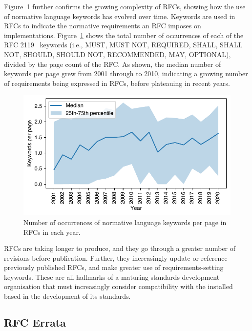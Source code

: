 \documentclass[twocolumn,10pt]{article}
\newlength{\figureWidthOneColumn}
\newcommand{\pb}[1]{\vspace{0.75ex}\noindent{\textbf{#1}}}
\begin{document}
Figure~\ref{fig:keyword_usage_rates} further confirms the growing complexity
of RFCs, showing how the use of normative language keywords has evolved
over time.  Keywords are used in RFCs to indicate the normative requirements
an RFC imposes on implementations. Figure~\ref{fig:keyword_usage_rates}
shows the total number of occurrences of each of the RFC 2119~\cite{RFC2119}
keywords (i.e., MUST, MUST NOT, REQUIRED, SHALL, SHALL NOT, SHOULD, SHOULD
NOT, RECOMMENDED, MAY, OPTIONAL), divided by the page count of the RFC. As
shown, the median number of keywords per page grew from 2001 through to
2010, indicating a growing number of requirements being expressed in RFCs,
before plateauing in recent years.

\begin{figure}
  \centering
  \includegraphics[width=\figureWidthOneColumn]{figures-prev/imc-2021/documents/keyword_usage_rate.pdf}
  \caption{
    Number of occurrences of normative language keywords per page in RFCs
    in each year.
  }
  \label{fig:keyword_usage_rates}
\end{figure}

\pb{Summary:}
RFCs are taking longer to produce, and they go through a greater number
of revisions before publication. Further, they increasingly update or
reference previously published RFCs, and make greater use of
requirements-setting keywords. These are all hallmarks of a maturing
standards development organisation that must increasingly consider
compatibility with the installed based in the development of its standards.


\subsection{RFC Errata}
\label{sec:trends-documents:errata}
\end{document}
